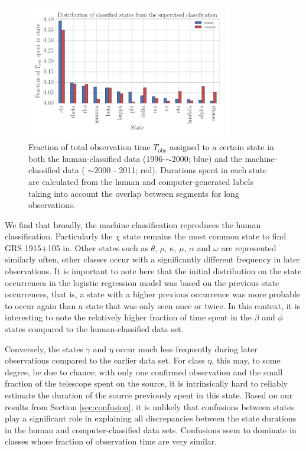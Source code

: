 \documentclass[fleqn,usenatbib]{mnras}
\begin{document}
\begin{figure}
\begin{center}
\includegraphics[width=9cm]{grs1915_supervised_states_histogram.pdf}
\caption{Fraction of total observation time $T_\mathrm{obs}$ assigned to a certain state in both the human-classified data (1996-$\sim\!\! 2000$; blue) and the machine-classified data ( $\sim\!\! 2000$ - 2011; red). Durations spent in each state are calculated from the human and computer-generated labels taking into 
account the overlap between segments for long observations.} 
\label{fig:state_durations}
\end{center}
\end{figure}

We find that broadly, the machine classification reproduces the human classification. Particularly the $\chi$ state remains the most common state to find GRS 1915+105 in. Other states such as $\theta$, $\rho$, $\kappa$, $\mu$, $\alpha$ and $\omega$ are represented similarly often, other classes occur with a significantly different frequency in later observations. It is important to note here that the initial distribution on the state occurrences in the logistic regression model was based on the previous state occurrences, that is, a state with a higher previous occurrence was more probable to occur again than a state that was only seen once or twice. In this context, it is interesting to note the relatively higher fraction of time spent in the $\beta$ and $\phi$ states compared to the human-classified data set.

Conversely, the states $\gamma$ and $\eta$ occur much less frequently during later observations compared to the earlier data set. For class $\eta$, this may, to some degree, be due to chance: with only one confirmed observation and the small fraction of the telescope spent on the source, it is intrinsically hard to reliably estimate the duration of the source previously spent in this state. 
Based on our results from Section \ref{sec:confusion}, it is unlikely that confusions between states play a significant role in explaining all discrepancies between the state durations in the human and computer-classified data sets. Confusions seem to dominate in classes whose fraction of observation time are very similar.
\end{document}
